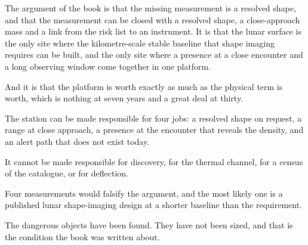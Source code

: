The argument of the book is that the missing measurement is a resolved
shape, and that the measurement can be closed with a resolved shape, a
close-approach mass and a link from the risk list to an instrument. It is
that the lunar surface is the only site where the kilometre-scale stable
baseline that shape imaging requires can be built, and the only site where
a presence at a close encounter and a long observing window come together in
one platform.

And it is that the platform is worth exactly as much as the physical term
is worth, which is nothing at seven years and a great deal at thirty.

\begin{keytakeaways}
\item The station can be made responsible for four jobs: a resolved shape on
request, a range at close approach, a presence at the encounter that reveals
the density, and an alert path that does not exist today.
\item It cannot be made responsible for discovery, for the thermal channel,
for a census of the catalogue, or for deflection.
\item Four measurements would falsify the argument, and the most likely one
is a published lunar shape-imaging design at a shorter baseline than the
requirement.
\item The dangerous objects have been found. They have not been sized, and
that is the condition the book was written about.
\end{keytakeaways}
